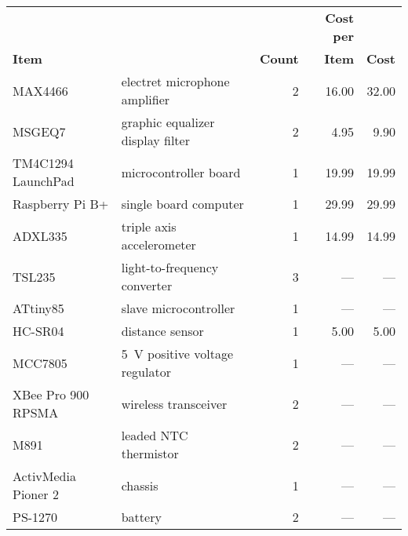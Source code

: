 {\footnotesize
\begin{tabular}{llrrr}
                                                            &&                  & \textbf{Cost per}     &                       \\
    \multicolumn{2}{l}{\textbf{Item}}			& \textbf{Count}    & \textbf{Item}         & \textbf{Cost}         \\ \hline
    MAX4466 & electret microphone amplifier                 & 2                 & 16.00                 & 32.00                 \\
    MSGEQ7 & graphic equalizer display filter               & 2                 & 4.95                  & 9.90                  \\
    TM4C1294 LaunchPad & microcontroller board              & 1                 & 19.99                 & 19.99                 \\
    Raspberry Pi B+ & single board computer                 & 1                 & 29.99                 & 29.99                 \\
    ADXL335 & triple axis accelerometer                     & 1                 & 14.99                 & 14.99                 \\
    TSL235 & light-to-frequency converter                   & 3                 & ---                   & ---                   \\
    ATtiny85 & slave microcontroller                        & 1                 & ---                   & ---                   \\
    HC-SR04 & distance sensor                               & 1                 & 5.00                  & 5.00                  \\
    MCC7805 & \SI{5}{\volt} positive voltage regulator      & 1                 & ---                   & ---                   \\
    XBee Pro 900 RPSMA & wireless transceiver               & 2                 & ---                   & ---                   \\
    M891 & leaded NTC thermistor                            & 2                 & ---                   & ---                   \\
    ActivMedia Pioner 2 & chassis                           & 1                 & ---                   & ---                   \\
    PS-1270 & battery                                       & 2                 & ---                   & ---                   \\

\end{tabular}}
